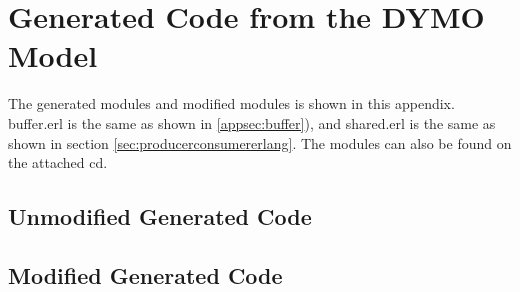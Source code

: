 \chapter{Generated Code from the DYMO Model}
\label{app:dymocode}
The generated modules and modified modules is shown in this appendix. buffer.erl is the same as shown in \ref{appsec:buffer}), and shared.erl is the same as shown in section \ref{sec:producerconsumererlang}. The modules can also be found on the attached cd. 

\section{Unmodified Generated Code}
\label{appsec:dymocode_unmod}








\section{Modified Generated Code}
\label{appsec:dymocode_mod}







